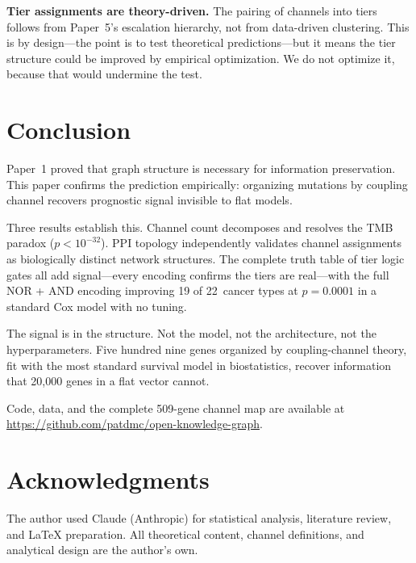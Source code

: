 \documentclass[11pt]{article}
\begin{document}
\textbf{Tier assignments are theory-driven.} The pairing of
channels into tiers follows from Paper~5's escalation hierarchy,
not from data-driven clustering. This is by design---the point
is to test theoretical predictions---but it means the tier
structure could be improved by empirical optimization. We do not
optimize it, because that would undermine the test.

\section{Conclusion}
\label{sec:conclusion}

Paper~1 proved that graph structure is necessary for information
preservation. This paper confirms the prediction empirically:
organizing mutations by coupling channel recovers prognostic
signal invisible to flat models.

Three results establish this. Channel count decomposes and
resolves the TMB paradox ($p < 10^{-32}$). PPI topology
independently validates channel assignments as biologically
distinct network structures. The complete truth table of tier
logic gates all add signal---every encoding confirms the tiers
are real---with the full NOR + AND encoding improving 19 of
22~cancer types at $p = 0.0001$ in a standard Cox model with
no tuning.

The signal is in the structure. Not the model, not the
architecture, not the hyperparameters. Five hundred nine genes
organized by coupling-channel theory, fit with the most standard
survival model in biostatistics, recover information that
20{,}000 genes in a flat vector cannot.

Code, data, and the complete 509-gene channel map are available
at \url{https://github.com/patdmc/open-knowledge-graph}.

\section*{Acknowledgments}

The author used Claude (Anthropic) for statistical analysis,
literature review, and \LaTeX{} preparation. All theoretical
content, channel definitions, and analytical design are the
author's own.
\end{document}
